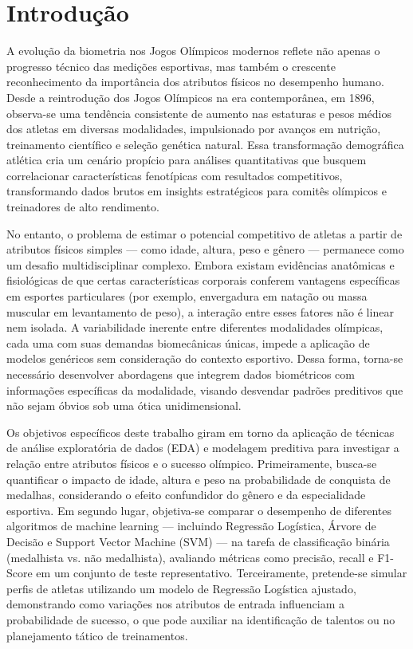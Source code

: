 \documentclass{article}
\begin{document}
\section{Introdução}

A evolução da biometria nos Jogos Olímpicos modernos reflete não apenas o progresso técnico das medições esportivas, mas também o crescente reconhecimento da importância dos atributos físicos no desempenho humano. Desde a reintrodução dos Jogos Olímpicos na era contemporânea, em 1896, observa-se uma tendência consistente de aumento nas estaturas e pesos médios dos atletas em diversas modalidades, impulsionado por avanços em nutrição, treinamento científico e seleção genética natural. Essa transformação demográfica atlética cria um cenário propício para análises quantitativas que busquem correlacionar características fenotípicas com resultados competitivos, transformando dados brutos em insights estratégicos para comitês olímpicos e treinadores de alto rendimento.

No entanto, o problema de estimar o potencial competitivo de atletas a partir de atributos físicos simples — como idade, altura, peso e gênero — permanece como um desafio multidisciplinar complexo. Embora existam evidências anatômicas e fisiológicas de que certas características corporais conferem vantagens específicas em esportes particulares (por exemplo, envergadura em natação ou massa muscular em levantamento de peso), a interação entre esses fatores não é linear nem isolada. A variabilidade inerente entre diferentes modalidades olímpicas, cada uma com suas demandas biomecânicas únicas, impede a aplicação de modelos genéricos sem consideração do contexto esportivo. Dessa forma, torna-se necessário desenvolver abordagens que integrem dados biométricos com informações específicas da modalidade, visando desvendar padrões preditivos que não sejam óbvios sob uma ótica unidimensional.

Os objetivos específicos deste trabalho giram em torno da aplicação de técnicas de análise exploratória de dados (EDA) e modelagem preditiva para investigar a relação entre atributos físicos e o sucesso olímpico. Primeiramente, busca-se quantificar o impacto de idade, altura e peso na probabilidade de conquista de medalhas, considerando o efeito confundidor do gênero e da especialidade esportiva. Em segundo lugar, objetiva-se comparar o desempenho de diferentes algoritmos de machine learning — incluindo Regressão Logística, Árvore de Decisão e Support Vector Machine (SVM) — na tarefa de classificação binária (medalhista vs. não medalhista), avaliando métricas como precisão, recall e F1-Score em um conjunto de teste representativo. Terceiramente, pretende-se simular perfis de atletas utilizando um modelo de Regressão Logística ajustado, demonstrando como variações nos atributos de entrada influenciam a probabilidade de sucesso, o que pode auxiliar na identificação de talentos ou no planejamento tático de treinamentos.
\end{document}
